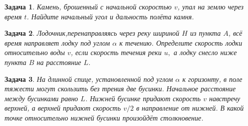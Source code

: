 \documentclass[a5paper,11pt]{article}
\newtheorem{task}{Задача}
\begin{document}
\begin{task}
Камень, брошенный с начальной скоростью $v$, упал на землю через время $t$. Найдите начальный угол
и дальность полёта камня.
\label{task:k-09-2-9}
\end{task}
\begin{task}
Лодочник,перенаправляясь через реку шириной $H$ из пункта $A$, всё время направляет лодку
под углом $\alpha$ к течению. Определите скорость лодки относительно воды $v$, если скорость
течения реки $u,$ а лодку снесло ниже пункта $B$ на расстояние $L$.
\label{task:k-09-1-10}
\end{task}
\begin{task}
На длинной спице, установленной под углом $\alpha$ к горизонту, в поле тяжести могут скользить
без трения две бусинки. Начальное расстояние между бусинками равно $L$. Нижней бусинке придают
скорость $v$ навстречу верхней, а верхней придают скорость $v/2$ в направление от нижней. В какой точке
относительно нижней бусинки произойдёт столкновение.
\label{task:k-11-1}
\end{task}
\end{document}
